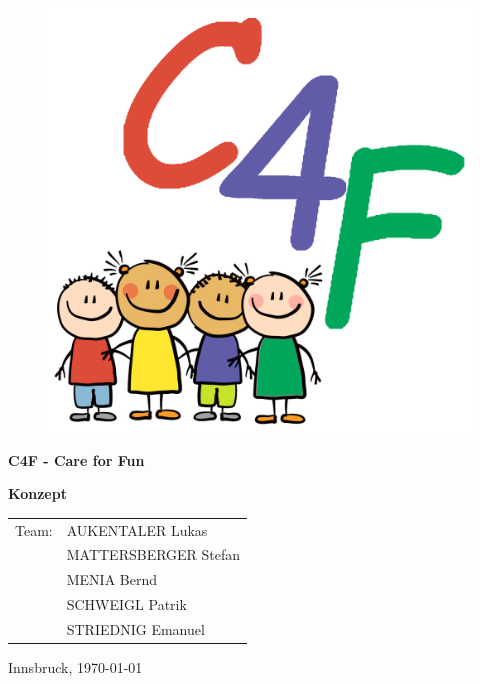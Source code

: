 \thispagestyle{empty}
\begin{center}
  \begin{figure}[t]
  \includegraphics[width = 130mm]{pictures/C4F_logo_login.png}
 \end{figure}
\end{center}
\newpage
\begin{center}
  \textbf{\LARGE C4F - Care for Fun}
\end{center}
\vspace{10cm}

\begin{flushleft}
\textbf{\LARGE Konzept}

\vspace{3cm}
\begin{table}[htbp]
\Large
\begin{tabular}{cl}
   Team: & AUKENTALER Lukas \\ 
   & MATTERSBERGER Stefan \\ 
   & MENIA Bernd \\
   & SCHWEIGL Patrik \\
   & STRIEDNIG Emanuel \\
 \end{tabular}
\end{table}
\end{flushleft}

\large Innsbruck, \today

\vfill